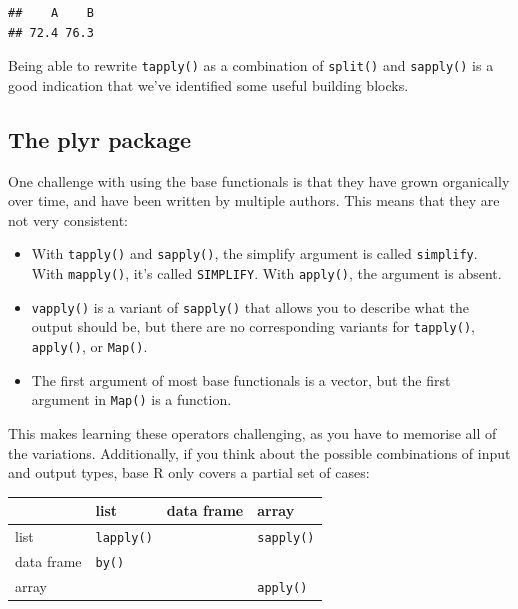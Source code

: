 \begin{Shaded}
\begin{Highlighting}[]
\end{Highlighting}
\end{Shaded}

\begin{verbatim}
##    A    B 
## 72.4 76.3
\end{verbatim}

Being able to rewrite \texttt{tapply()} as a combination of
\texttt{split()} and \texttt{sapply()} is a good indication that we've
identified some useful building blocks. 

\hypertarget{the-plyr-package}{%
\subsection{The plyr package}\label{the-plyr-package}}

One challenge with using the base functionals is that they have grown
organically over time, and have been written by multiple authors. This
means that they are not very consistent: 

\begin{itemize}
\item
  With \texttt{tapply()} and \texttt{sapply()}, the simplify argument is
  called \texttt{simplify}. With \texttt{mapply()}, it's called
  \texttt{SIMPLIFY}. With \texttt{apply()}, the argument is absent.
\item
  \texttt{vapply()} is a variant of \texttt{sapply()} that allows you to
  describe what the output should be, but there are no corresponding
  variants for \texttt{tapply()}, \texttt{apply()}, or \texttt{Map()}.
\item
  The first argument of most base functionals is a vector, but the first
  argument in \texttt{Map()} is a function.
\end{itemize}

This makes learning these operators challenging, as you have to memorise
all of the variations. Additionally, if you think about the possible
combinations of input and output types, base R only covers a partial set
of cases:

\begin{longtable}[]{@{}llll@{}}
\toprule
& list & data frame & array\tabularnewline
\midrule
\endhead
list & \texttt{lapply()} & & \texttt{sapply()}\tabularnewline
data frame & \texttt{by()} & &\tabularnewline
array & & & \texttt{apply()}\tabularnewline
\bottomrule
\end{longtable}

